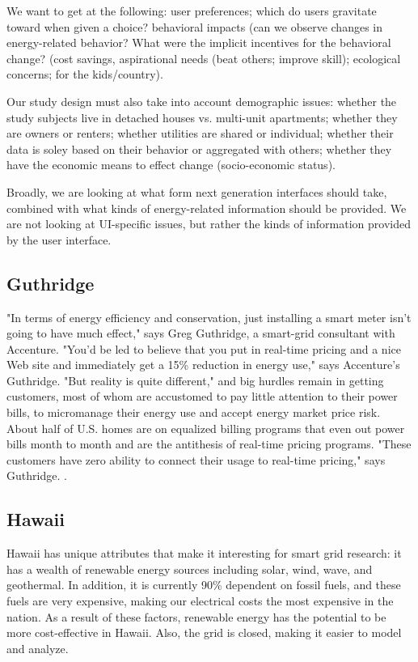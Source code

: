 We want to get at the following:  user preferences; which do users
gravitate toward when given a choice? behavioral impacts (can we observe
changes in energy-related behavior?  What were the implicit incentives for
the behavioral change? (cost savings, aspirational needs (beat others;
improve skill); ecological concerns; for the kids/country).  

Our study design must also take into account demographic issues: whether
the study subjects live in detached houses vs. multi-unit apartments;
whether they are owners or renters; whether utilities are shared or
individual; whether their data is soley based on their behavior or
aggregated with others; whether they have the economic means to effect
change (socio-economic status). 

Broadly, we are looking at what form next generation interfaces should
take, combined with what kinds of energy-related information should be
provided.  We are not looking at UI-specific issues, but rather the kinds
of information provided by the user interface. 

\subsection{Guthridge}

"In terms of energy efficiency and conservation, just installing a smart
meter isn't going to have much effect," says Greg Guthridge, a smart-grid
consultant with Accenture.  "You'd be led to believe that you put in
real-time pricing and a nice Web site and immediately get a 15\% reduction
in energy use," says Accenture's Guthridge. "But reality is quite
different," and big hurdles remain in getting customers, most of whom are
accustomed to pay little attention to their power bills, to micromanage
their energy use and accept energy market price risk.  About half of
U.S. homes are on equalized billing programs that even out power bills
month to month and are the antithesis of real-time pricing programs. "These
customers have zero ability to connect their usage to real-time pricing,"
says Guthridge. \cite{Stone09}.

\subsection{Hawaii}

Hawaii has unique attributes that make it interesting for smart grid
research: it has a wealth of renewable energy sources including solar,
wind, wave, and geothermal.  In addition, it is currently 90\% dependent on
fossil fuels, and these fuels are very expensive, making our electrical
costs the most expensive in the nation.  As a result of these factors,
renewable energy has the potential to be more cost-effective in Hawaii.
Also, the grid is closed, making it easier to model and analyze.



